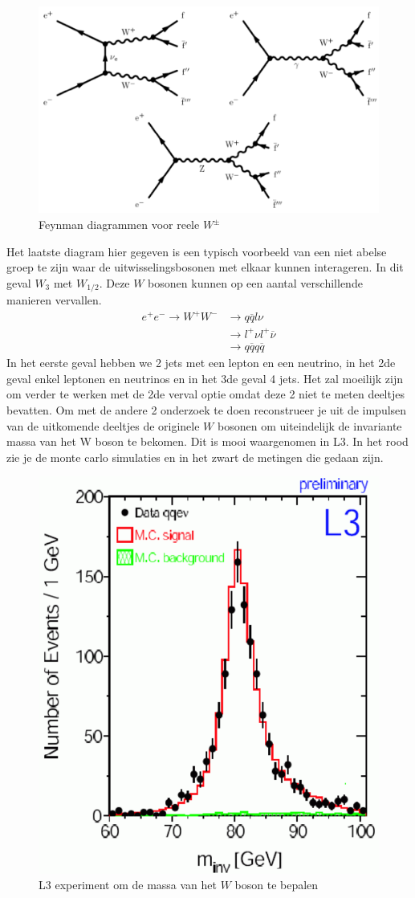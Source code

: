 \documentclass[../main.tex]{subfiles}
\begin{document}
\begin{figure}[h]
    \centering
    \includegraphics[width=0.6\linewidth]{elektroweak_precision_tests/reele_w_diagrammen.png}
    \caption{Feynman diagrammen voor reele $W^\pm$}%
    \label{fig:elektroweak_precision_tests/reele_w_diagrammen}
\end{figure}

Het laatste diagram hier gegeven is een typisch voorbeeld van een niet abelse groep te zijn waar de uitwisselingsbosonen met elkaar kunnen interageren. In dit geval $W_3$ met $W_{1/2}$. Deze $W$ bosonen kunnen op een aantal verschillende manieren vervallen.
\begin{equation}
    \begin{aligned}
        \label{eq:verval_w_boson}
        e^+e^- \rightarrow W^+W^- &\rightarrow q\overline q l\nu\\
                                  &\rightarrow l^+\nu l^+\overline \nu\\
                                  &\rightarrow q\overline q q\overline q
    \end{aligned}
\end{equation}
In het eerste geval hebben we 2 jets met een lepton en een neutrino, in het 2de geval enkel leptonen en neutrinos en in het 3de geval 4 jets. Het zal moeilijk zijn om verder te werken met de 2de verval optie omdat deze 2 niet te meten deeltjes bevatten. Om met de andere 2 onderzoek te doen reconstrueer je uit de impulsen van de uitkomende deeltjes de originele $W$ bosonen om uiteindelijk de invariante massa van het W boson te bekomen. Dit is mooi waargenomen in L3. In het rood zie je de monte carlo simulaties en in het zwart de metingen die gedaan zijn.

\begin{figure}[h]
    \centering
    \includegraphics[width=0.4\linewidth]{elektroweak_precision_tests/invar_massa_w.png}
    \caption{L3 experiment om de massa van het $W$ boson te bepalen}%
    \label{fig:elektroweak_precision_tests/invar_massa_w}
\end{figure}
\end{document}
